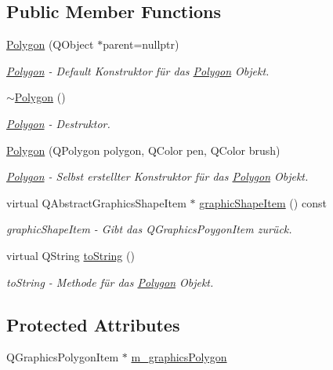 \subsection*{Public Member Functions}
\begin{DoxyCompactItemize}
\item 
\hyperlink{class_polygon_acca8d3957dfbd44bb27c4519d2bfeb83}{Polygon} (Q\+Object $\ast$parent=nullptr)
\begin{DoxyCompactList}\small\item\em \hyperlink{class_polygon}{Polygon} -\/ Default Konstruktor für das \hyperlink{class_polygon}{Polygon} Objekt. \end{DoxyCompactList}\item 
\hyperlink{class_polygon_ace39c67107966db12e13a183f496c3b0}{$\sim$\+Polygon} ()
\begin{DoxyCompactList}\small\item\em \hyperlink{class_polygon}{Polygon} -\/ Destruktor. \end{DoxyCompactList}\item 
\hyperlink{class_polygon_a848d8c9194ace0906ae31bb9c26e3829}{Polygon} (Q\+Polygon polygon, Q\+Color pen, Q\+Color brush)
\begin{DoxyCompactList}\small\item\em \hyperlink{class_polygon}{Polygon} -\/ Selbst erstellter Konstruktor für das \hyperlink{class_polygon}{Polygon} Objekt. \end{DoxyCompactList}\item 
virtual Q\+Abstract\+Graphics\+Shape\+Item $\ast$ \hyperlink{class_polygon_aebf0f177dbc4da17a1822be5a0063b25}{graphic\+Shape\+Item} () const
\begin{DoxyCompactList}\small\item\em graphic\+Shape\+Item -\/ Gibt das Q\+Graphics\+Poygon\+Item zurück. \end{DoxyCompactList}\item 
virtual Q\+String \hyperlink{class_polygon_a588df36c92bfa626e0a16acb07162fa3}{to\+String} ()
\begin{DoxyCompactList}\small\item\em to\+String -\/ Methode für das \hyperlink{class_polygon}{Polygon} Objekt. \end{DoxyCompactList}\end{DoxyCompactItemize}
\subsection*{Protected Attributes}
\begin{DoxyCompactItemize}
\item 
Q\+Graphics\+Polygon\+Item $\ast$ \hyperlink{class_polygon_a464037e9e2eb2a1fa131eed357d02f83}{m\+\_\+graphics\+Polygon}
\end{DoxyCompactItemize}
